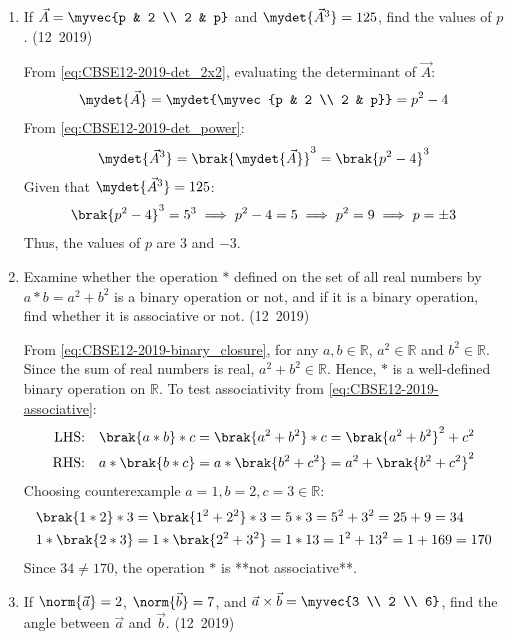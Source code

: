 \begin{enumerate}[label=\thesubsection.\arabic*, ref=\thesubsection.\theenumi]
\item If $\vec{A} = \myvec{p & 2 \\ 2 & p}$ and $\mydet{\vec{A}^3} = 125$, find the values of $p$.
\hfill (12~2019)

\solution
From \eqref{eq:CBSE12-2019-det_2x2}, evaluating the determinant of $\vec{A}$:
\begin{align}
	\mydet{\vec{A}} = \mydet{\myvec{p & 2 \\ 2 & p}} = p^2 - 4
\end{align}
From \eqref{eq:CBSE12-2019-det_power}:
\begin{align}
	\mydet{\vec{A}^3} = \brak{\mydet{\vec{A}}}^3 = \brak{p^2 - 4}^3
\end{align}
Given that $\mydet{\vec{A}^3} = 125$:
\begin{align}
	\brak{p^2 - 4}^3 = 5^3 \implies p^2 - 4 = 5 \implies p^2 = 9 \implies p = \pm 3
\end{align}
Thus, the values of $p$ are $3$ and $-3$.


\item Examine whether the operation $*$ defined on the set of all real numbers by $a*b = a^2 + b^2$ is a binary operation or not, and if it is a binary operation, find whether it is associative or not.
\hfill (12~2019)

\solution
From \eqref{eq:CBSE12-2019-binary_closure}, for any $a, b \in \mathbb{R}$, $a^2 \in \mathbb{R}$ and $b^2 \in \mathbb{R}$. Since the sum of real numbers is real, $a^2 + b^2 \in \mathbb{R}$. Hence, $*$ is a well-defined binary operation on $\mathbb{R}$.
To test associativity from \eqref{eq:CBSE12-2019-associative}:
\begin{align}
	\text{LHS:} \quad \brak{a * b} * c &= \brak{a^2 + b^2} * c = \brak{a^2 + b^2}^2 + c^2 \\
	\text{RHS:} \quad a * \brak{b * c} &= a * \brak{b^2 + c^2} = a^2 + \brak{b^2 + c^2}^2
\end{align}
Choosing counterexample $a = 1, b = 2, c = 3 \in \mathbb{R}$:
\begin{align}
	\brak{1 * 2} * 3 &= \brak{1^2 + 2^2} * 3 = 5 * 3 = 5^2 + 3^2 = 25 + 9 = 34 \\
	1 * \brak{2 * 3} &= 1 * \brak{2^2 + 3^2} = 1 * 13 = 1^2 + 13^2 = 1 + 169 = 170
\end{align}
Since $34 \neq 170$, the operation $*$ is **not associative**.

\item If $\norm{\vec{a}} = 2$, $\norm{\vec{b}} = 7$, and $\vec{a} \times \vec{b} = \myvec{3 \\ 2 \\ 6}$, find the angle between $\vec{a}$ and $\vec{b}$.
\hfill (12~2019)


\end{enumerate}
